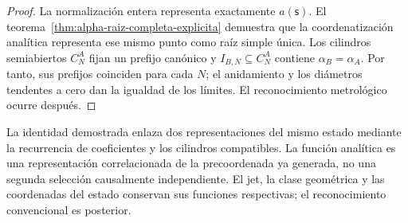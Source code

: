 \begin{proof}
La normalización entera representa exactamente \(a(\mathsf s)\). El
teorema~\ref{thm:alpha-raiz-completa-explicita} demuestra que la coordenatización
analítica representa ese mismo punto como raíz simple única. Los
cilindros semiabiertos \(C_N^A\) fijan un prefijo canónico y
\(I_{B,N}\subseteq C_N^A\) contiene \(\alpha_B=\alpha_A\). Por tanto, sus
prefijos coinciden para cada \(N\); el anidamiento y los diámetros tendentes a
cero dan la igualdad de los límites. El reconocimiento
metrológico ocurre después.
\end{proof}

La identidad demostrada enlaza dos representaciones del mismo estado
mediante la recurrencia de coeficientes y los cilindros compatibles.
La función analítica es una representación correlacionada de la
precoordenada ya generada, no una segunda selección causalmente
independiente. El jet, la clase geométrica y las coordenadas del estado
conservan sus funciones respectivas; el reconocimiento convencional es posterior.
